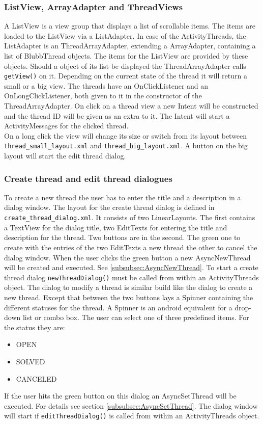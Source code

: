 \documentclass[12pt,a4paper,oneside]{report}
\newcommand{\code}[1]{\lstinline{#1}}
\begin{document}
\subsubsection{ListView, ArrayAdapter and ThreadViews}
A ListView is a view group that displays a list of scrollable items\citep{aDefListView}. The items are loaded to the ListView via a ListAdapter. In case of the ActivityThreads, the ListAdapter is an ThreadArrayAdapter, extending a ArrayAdapter, containing a list of BlubbThread objects. The items for the ListView are provided by these objects. Should a object of its list be displayed the ThreadArrayAdapter calls \code{getView()} on it. Depending on the current state of the thread it will return a small or a big view. The threads have an OnClickListener and an OnLongClickListener, both given to it in the constructor of the ThreadArrayAdapter. On click on a thread view a new Intent will be constructed and the thread ID will be given as an extra to it. The Intent will start a ActivityMessages for the clicked thread.\\
On a long click the view will change its size or switch from its layout between \code{thread_small_layout.xml} and \code{thread_big_layout.xml}. A button on the big layout will start the edit thread dialog.\\

\subsubsection{Create thread and edit thread dialogues}
To create a new thread the user has to enter the title and a description in a dialog window. The layout for the create thread dialog is defined in \code{create_thread_dialog.xml}. It consists of two LinearLayouts. The first contains a TextView for the dialog title, two EditTexts for entering the title and description for the thread. Two buttons are in the second. The green one to create with the entries of the two EditTexts a new thread the other to cancel the dialog window. When the user clicks the green button a new AsyncNewThread will be created and executed. See \ref{subsubsec:AsyncNewThread}. To start a create thread dialog \code{newThreadDialog()} must be called from within an ActivityThreads object.
The dialog to modify a thread is similar build like the dialog to create a new thread. Except that between the two buttons lays a Spinner containing the different statuses for the thread. A Spinner is an android equivalent for a drop-down list or combo box. The user can select one of three predefined items. For the status they are:
\begin{itemize}
\item OPEN
\item SOLVED
\item CANCELED
\end{itemize}
If the user hits the green button on this dialog an AsyncSetThread will be executed. For details see section \ref{subsubsec:AsyncSetThread}. The dialog window will start if \code{editThreadDialog()} is called from within an ActivityThreads object.
\end{document}
